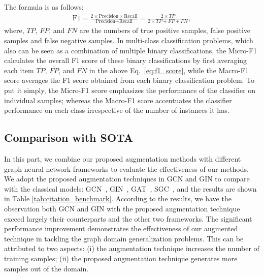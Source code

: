 The formula is as follows:
\begin{align}
    \text{F1}=\frac{2\times \text{Precision} \times \text{Recall}}{\text{Precision} + \text{Recall}}=\frac{2\times TP}{2\times TP+FP+FN},
    \label{eq:f1_score}
\end{align}
where, $TP$, $FP$, and $FN$ are the numbers of true positive samples, false positive samples and false negative samples. In multi-class classification problems, which also can be seen as a combination of multiple binary classifications, the Micro-F1 calculates the overall F1 score of these binary classifications by first averaging each item $\overline{TP}$, $\overline{FP}$, and $\overline{FN}$ in the above Eq.~\eqref{eq:f1_score}, while the Macro-F1 score averages the F1 score obtained from each binary classification problem. 
To put it simply, the Micro-F1 score emphasizes the performance of the classifier on individual samples; whereas the Macro-F1 score accentuates the classifier performance on each class irrespective of the number of instances it has.


\subsection{Comparison with SOTA }
In this part, we combine our proposed augmentation methods with different graph neural network frameworks to evaluate the effectiveness of our methods. We adopt the proposed augmentation techniques in GCN and GIN to compare with the classical models: GCN~\cite{kipf2017semi}, GIN~\cite{xu2018powerful}, GAT~\cite{velivckovicgraph}, SGC~\cite{wu2019simplifying}, and the results are shown in Table \ref{tab:citation_benchmark}. According to the results, we have the observation both GCN and GIN with the proposed augmentation technique exceed largely their counterparts and the other two frameworks. The significant performance improvement demonstrates the effectiveness of our augmented technique in tackling the graph domain generalization problems. This can be attributed to two aspects: (i) the augmentation technique increases the number of training samples; (ii) the proposed augmentation technique generates more samples out of the domain.


